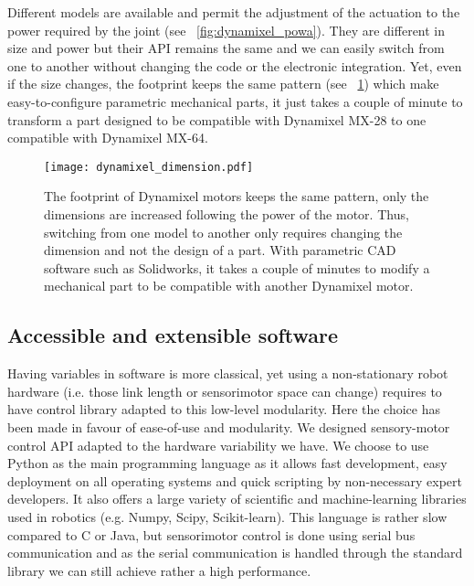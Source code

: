 Different models are available and permit the adjustment of the actuation to the power required by the joint (see \figurename~\ref{fig:dynamixel_powa}). They are different in size and power but their API remains the same and we can easily switch from one to another without changing the code or the electronic integration. Yet, even if the size changes, the footprint keeps the same pattern (see \figurename~\ref{fig:dynamixel_dimension}) which make easy-to-configure parametric mechanical parts, it just takes a couple of minute to transform a part designed to be compatible with Dynamixel MX-28 to one compatible with Dynamixel MX-64.


\begin{figure}[tb]
    \begin{center}
        \texttt{[image: dynamixel\_dimension.pdf]}
    \end{center}
    \caption{The footprint of Dynamixel motors keeps the same pattern, only the dimensions are increased following the power of the motor. Thus, switching from one model to another only requires changing the dimension and not the design of a part. With parametric CAD software such as Solidworks, it takes a couple of minutes to modify a mechanical part to be compatible with another Dynamixel motor.}
    \label{fig:dynamixel_dimension}
\end{figure}


\subsection{Accessible and extensible software} %

Having variables in software is more classical, yet using a non-stationary robot hardware (i.e. those link length or sensorimotor space can change) requires to have control library adapted to this low-level modularity. Here the choice has been made in favour of ease-of-use and modularity. We designed sensory-motor control API adapted to the hardware variability we have. We choose to use Python as the main programming language as it allows fast development, easy deployment on all operating systems and quick scripting by non-necessary expert developers. It also offers a large variety of scientific and machine-learning libraries used in robotics (e.g. Numpy, Scipy, Scikit-learn).
This language is rather slow compared to C or Java, but sensorimotor control is done using serial bus communication and as the serial communication is handled through the standard library we can still achieve rather a high performance.

